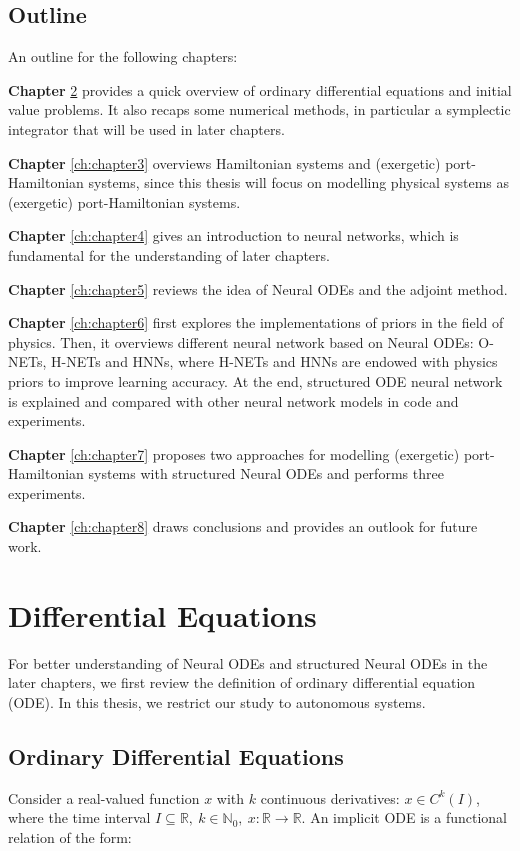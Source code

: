 \documentclass[
	parskip, 			   %
	twoside, 			   %
	DIV=14, 			   %
	BCOR=15.0mm, 		   %
	headsepline, 		   %
	open=right, 		   %
	captions=tableheading, %
	bibliography=totoc,    %
	numbers=noenddot       %
]{scrreprt}
\begin{document}
\section{Outline}
An outline for the following chapters:

\textbf{Chapter} \ref{ch:chapter2} provides a quick overview of ordinary differential equations and initial value problems. It also recaps some numerical methods, in particular a symplectic integrator that will be used in later chapters.

\textbf{Chapter} \ref{ch:chapter3} overviews Hamiltonian systems and (exergetic) port-Hamiltonian systems, since this thesis will focus on modelling physical systems as (exergetic) port-Hamiltonian systems.

\textbf{Chapter} \ref{ch:chapter4} gives an introduction to neural networks, which is fundamental for the understanding of later chapters.

\textbf{Chapter} \ref{ch:chapter5} reviews the idea of Neural ODEs and the adjoint method.

\textbf{Chapter} \ref{ch:chapter6} first explores the implementations of priors in the field of physics. Then, it overviews different neural network based on Neural ODEs: O-NETs, H-NETs and HNNs, where H-NETs and HNNs are endowed with physics priors to improve learning accuracy. At the end, structured ODE neural network is explained and compared with other neural network models in code and experiments.

\textbf{Chapter} \ref{ch:chapter7} proposes two approaches for modelling (exergetic) port-Hamiltonian systems with structured Neural ODEs and performs three experiments.

\textbf{Chapter} \ref{ch:chapter8} draws conclusions and provides an outlook for future work.


\clearpage
\chapter{Differential Equations}
\label{ch:chapter2}
For better understanding of Neural ODEs and structured Neural ODEs in the later chapters, we first review the definition of ordinary differential equation (ODE). In this thesis, we restrict our study to autonomous systems.
\section{Ordinary Differential Equations}
Consider a real-valued function $x$ with $k$ continuous derivatives: $x \in C^{k}(I)$, where the time interval $ I \subseteq \mathbb{R}, \: k \in \mathbb{N}_{0}, \: x: \mathbb{R} \rightarrow \mathbb{R}$. An implicit ODE is a functional relation of the form:
\end{document}
